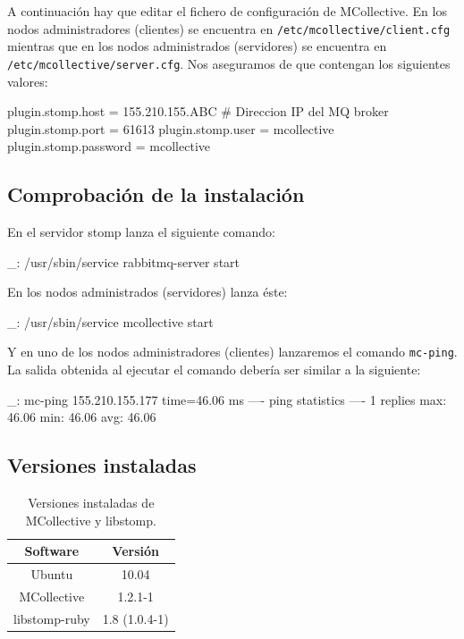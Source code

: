 A continuación hay que editar el fichero de configuración de MCollective. En los nodos administradores (clientes) se encuentra en \texttt{/etc/mcollective/client.cfg} mientras que en los nodos administrados (servidores) se encuentra en \texttt{/etc/mcollective/server.cfg}. Nos aseguramos de que contengan los siguientes valores:

\begin{bashcode}
plugin.stomp.host = 155.210.155.ABC # Direccion IP del MQ broker
plugin.stomp.port = 61613
plugin.stomp.user = mcollective
plugin.stomp.password = mcollective
\end{bashcode}


\subsection{Comprobación de la instalación}

En el servidor stomp lanza el siguiente comando:

\begin{bashcode}
_: /usr/sbin/service rabbitmq-server start
\end{bashcode}

En los nodos administrados (servidores) lanza éste:

\begin{bashcode}
_: /usr/sbin/service mcollective start
\end{bashcode}

Y en uno de los nodos administradores (clientes) lanzaremos el comando \texttt{mc-ping}. La salida obtenida al ejecutar el comando debería ser similar a la siguiente:

\begin{bashcode}
_: mc-ping
155.210.155.177                       time=46.06 ms
---- ping statistics ----
1 replies max: 46.06 min: 46.06 avg: 46.06
\end{bashcode}


\subsection{Versiones instaladas}

\begin{table}[!htbp]
\centering
   \begin{tabular}{|c|c|}
      \hline
      \textbf{Software} & \textbf{Versión} \\ \hline
      Ubuntu & 10.04 \\ \hline
      MCollective & 1.2.1-1 \\ \hline
      libstomp-ruby & 1.8 (1.0.4-1) \\ \hline
   \end{tabular}
\caption{Versiones instaladas de MCollective y libstomp.}
\label{table:mcollective-versions}
\end{table}


